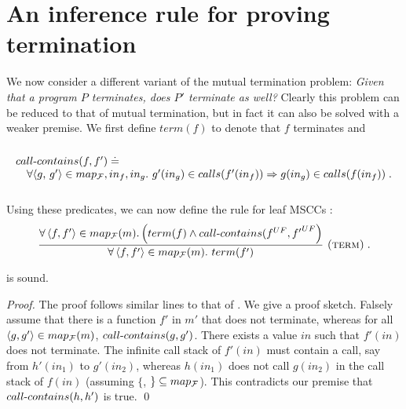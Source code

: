 
\section{An inference rule for proving termination} \label{sec:term}
We now consider a different variant of the mutual termination problem:
\emph{Given that a program $P$ terminates, does $P'$ terminate as well? }
%
Clearly this problem can be reduced to that of mutual termination, but in fact it can also
be solved with a weaker premise. We first define $term(f)$ to denote that $f$ terminates and
\[
\begin{array}{l}
  \ \ \ \ \\
{\sc call\mbox{-}contains}(f,f') \doteq \\
  \ \ \ \forall \text{$\langle$$g$, $g'$$\rangle$} \in map_{\cal F}, in_f, in_g.\ g'(in_g) \in calls (f'(in_f)) \Rightarrow g(in_g) \in calls(f(in_f))\;.\\
  \ \ \ \
\end{array}
\]
\newline Using these predicates, we can now define the rule for leaf MSCCs :
\begin{equation}
\frac
{\forall\left\langle f, f' \right\rangle\in map_{\cal F}(m).\left(term(f)\wedge {\sc call\mbox{-}contains}({f}^{UF}, {f'}^{UF}\right)}
{\forall\left\langle f, f' \right\rangle\in map_{\cal F}(m).~term(f')}
\mbox{\ {\sc (term)}} \;.
\end{equation}

\begin{theorem} \termd is sound. \end{theorem}
\begin{proof}
The proof follows similar lines to that of \mtermdp. We give a proof sketch.
Falsely assume that there is a function $f'$ in $m'$ that does not terminate, whereas for all $\langle g,g'\rangle \in map_{\cal F}(m)$, ${\sc call\mbox{-}contains}(g,g')$.
There exists a value $in$ such that $f'(in)$ does not terminate. The infinite call stack of $f'(in)$ must contain a call, say from $h'(in_1)$ to $g'(in_2)$, whereas $h(in_1)$ does not call $g(in_2)$ in the call stack of $f(in)$ (assuming $\{$, $\} \subseteq map_{\cal F}$).
This contradicts our premise that ${\sc call\mbox{-}contains}(h,h')$ is true. \qed
\end{proof}


